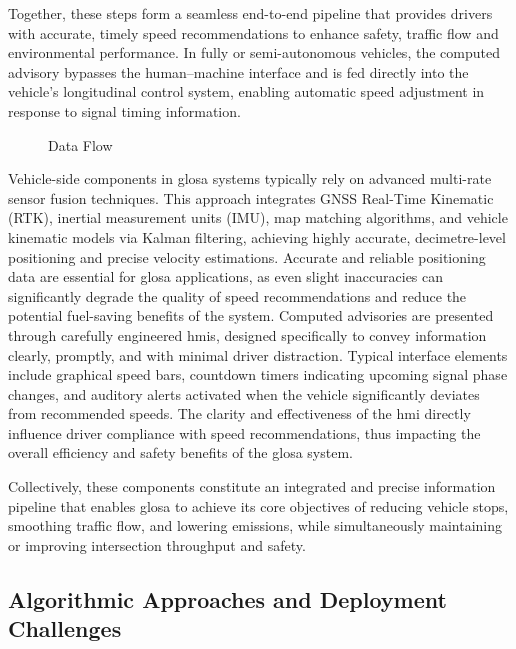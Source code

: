 Together, these steps form a seamless end-to-end pipeline that provides drivers with accurate, timely speed recommendations to enhance safety, traffic flow and environmental performance. In fully or semi-autonomous vehicles, the computed advisory bypasses the human–machine interface and is fed directly into the vehicle’s longitudinal control system, enabling automatic speed adjustment in response to signal timing information.

\begin{figure}[htbp]
  \centering
  \caption{Data Flow}
  \label{fig:glosa_architecture}
\end{figure}

Vehicle-side components in \ac{glosa} systems typically rely on advanced multi-rate sensor fusion techniques. This approach integrates GNSS Real-Time Kinematic (RTK), inertial measurement units (IMU), map matching algorithms, and vehicle kinematic models via Kalman filtering, achieving highly accurate, decimetre-level positioning and precise velocity estimations. Accurate and reliable positioning data are essential for \ac{glosa} applications, as even slight inaccuracies can significantly degrade the quality of speed recommendations and reduce the potential fuel-saving benefits of the system. \cite{Vignarca2023} Computed advisories are presented through carefully engineered \acp{hmi}, designed specifically to convey information clearly, promptly, and with minimal driver distraction. Typical interface elements include graphical speed bars, countdown timers indicating upcoming signal phase changes, and auditory alerts activated when the vehicle significantly deviates from recommended speeds. The clarity and effectiveness of the \ac{hmi} directly influence driver compliance with speed recommendations, thus impacting the overall efficiency and safety benefits of the \ac{glosa} system.

Collectively, these components constitute an integrated and precise information pipeline that enables \ac{glosa} to achieve its core objectives of reducing vehicle stops, smoothing traffic flow, and lowering emissions, while simultaneously maintaining or improving intersection throughput and safety.


\subsection{Algorithmic Approaches and Deployment Challenges}
\label{subsec:glosa_algorithms_challenges}

